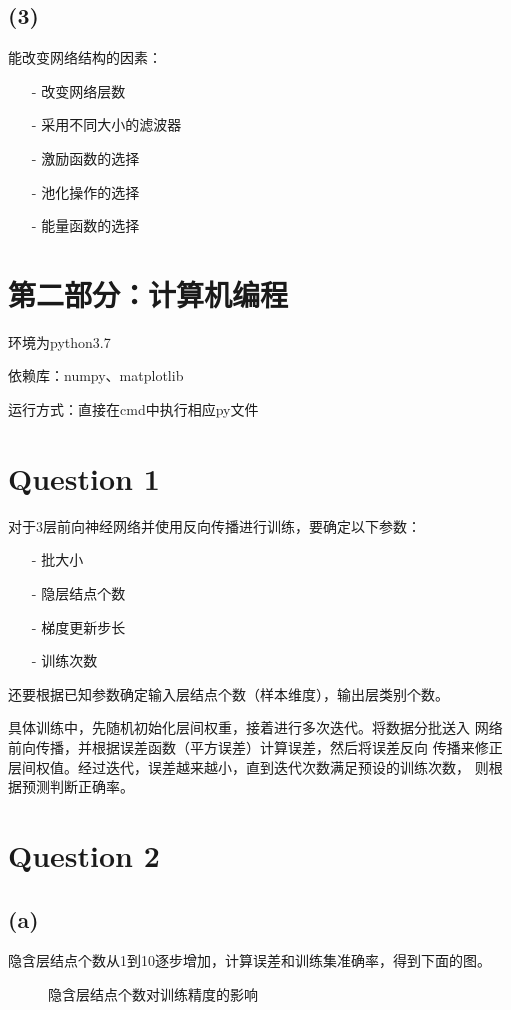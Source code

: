 \documentclass{article}
\newcommand{\question}[1]{\section*{Question #1}}
\renewcommand{\part}[1]{\subsection*{(#1)}}
\begin{document}
\part{3}
能改变网络结构的因素：
\begin{itemize}
	\item[-] 改变网络层数
	\item[-] 采用不同大小的滤波器
	\item[-] 激励函数的选择
	\item[-] 池化操作的选择
	\item[-] 能量函数的选择
\end{itemize}

\section*{第二部分：计算机编程}
环境为python3.7

依赖库：numpy、matplotlib

运行方式：直接在cmd中执行相应py文件

\question{1}
对于3层前向神经网络并使用反向传播进行训练，要确定以下参数：
\begin{itemize}
	\item[-] 批大小
	\item[-] 隐层结点个数
	\item[-] 梯度更新步长
	\item[-] 训练次数
\end{itemize}
还要根据已知参数确定输入层结点个数（样本维度），输出层类别个数。

具体训练中，先随机初始化层间权重，接着进行多次迭代。将数据分批送入
网络前向传播，并根据误差函数（平方误差）计算误差，然后将误差反向
传播来修正层间权值。经过迭代，误差越来越小，直到迭代次数满足预设的训练次数，
则根据预测判断正确率。

\question{2}
\part{a}
隐含层结点个数从1到10逐步增加，计算误差和训练集准确率，得到下面的图。
\begin{figure}[ht]
	\centering
	\centering
	\caption{隐含层结点个数对训练精度的影响}
	\label{figl}
\end{figure}
\end{document}
